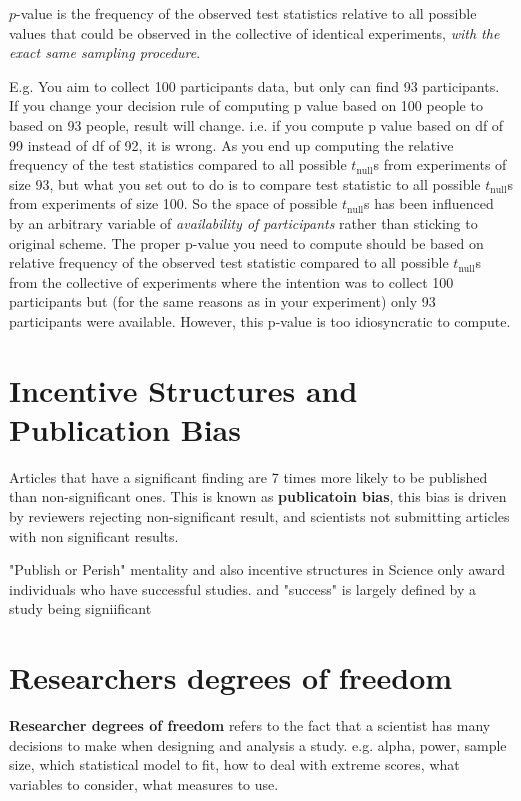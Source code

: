 $p$-value is the frequency of the observed test statistics relative to all possible values that could be observed in the collective of identical experiments, \emph{with the exact same sampling procedure}.

E.g. You aim to collect 100 participants data, but only can find 93 participants. If you change your decision rule of computing p value based on 100 people to based on 93 people, result will change. i.e. if you compute p value based on df of 99 instead of df of 92, it is wrong. As you end up computing the relative frequency of the test statistics compared to all possible $t_{\text{null}}$s from experiments of size 93, but what you set out to do is to compare test statistic to all possible $t_{\text{null}}$s from experiments of size 100.
So the space of possible $t_{\text{null}}$s has been influenced by an arbitrary variable of \emph{availability of participants} rather than sticking to original scheme. 
The proper p-value you need to compute should be based on relative frequency of the observed test statistic compared to all possible $t_{\text{null}}$s from the collective of experiments where the intention was to collect 100 participants but (for the same reasons as in your experiment) only 93 participants were available. However, this p-value is too idiosyncratic to compute.

\section{Incentive Structures and Publication Bias}
Articles that have a significant finding are 7 times more likely to be published than non-significant ones. This is known as \textbf{publicatoin bias}, this bias is driven by reviewers rejecting non-significant result, and scientists not submitting articles with non significant results. 

"Publish or Perish" mentality and also incentive structures in Science only award individuals who have successful studies. and "success" is largely defined by a study being signiificant

\section{Researchers degrees of freedom}
\textbf{Researcher degrees of freedom} refers to the fact that a scientist has many decisions to make when designing and analysis a study. e.g. alpha, power, sample size, which statistical model to fit, how to deal with extreme scores, what variables to consider, what measures to use.

